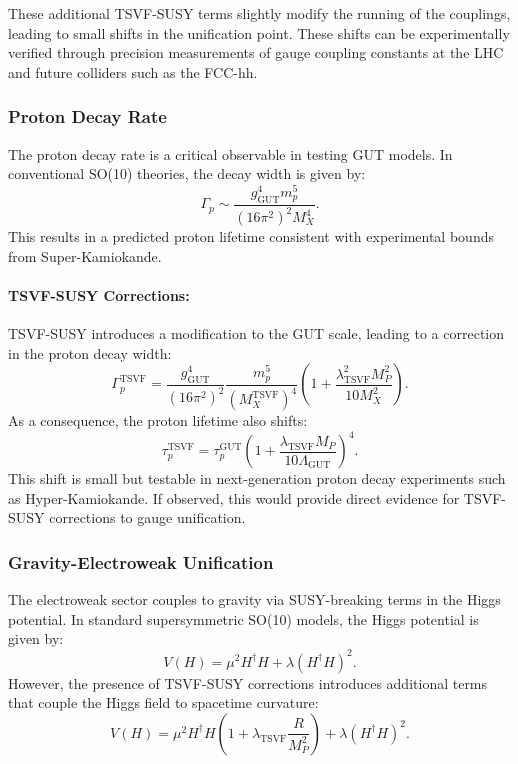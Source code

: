 \documentclass[twocolumn,superscriptaddress,floatfix]{revtex4-2}
\begin{document}
These additional TSVF-SUSY terms slightly modify the running of the couplings, leading to small shifts in the unification point. These shifts can be experimentally verified through precision measurements of gauge coupling constants at the LHC and future colliders such as the FCC-hh.

\subsubsection{Proton Decay Rate}
\label{subsec:proton_decay_rate}

The proton decay rate is a critical observable in testing GUT models. In conventional SO(10) theories, the decay width is given by:
\begin{equation}
\Gamma_p \sim \frac{g_{\text{GUT}}^4 m_p^5}{(16\pi^2)^2 M_X^4}. \label{eq:gamma_p}
\end{equation}
This results in a predicted proton lifetime consistent with experimental bounds from Super-Kamiokande.

\paragraph{TSVF-SUSY Corrections:} 
TSVF-SUSY introduces a modification to the GUT scale, leading to a correction in the proton decay width:
\begin{equation}
\Gamma_p^{\text{TSVF}} = \frac{g_{\text{GUT}}^4}{(16\pi^2)^2}\frac{m_p^5}{(M_X^{\text{TSVF}})^4}\left(1 + \frac{\lambda_{\text{TSVF}}^2 M_P^2}{10M_X^2}\right). \label{eq:Gamma_p}
\end{equation}
As a consequence, the proton lifetime also shifts:
\begin{equation}
\tau_p^{\text{TSVF}} = \tau_p^{\text{GUT}}\left(1 + \frac{\lambda_{\text{TSVF}} M_P}{10\Lambda_{\text{GUT}}}\right)^4. \label{eq:tau_TSVF}
\end{equation}
This shift is small but testable in next-generation proton decay experiments such as Hyper-Kamiokande. If observed, this would provide direct evidence for TSVF-SUSY corrections to gauge unification.

\subsubsection{Gravity-Electroweak Unification}
\label{subsec:ew_unification}

The electroweak sector couples to gravity via SUSY-breaking terms in the Higgs potential. In standard supersymmetric SO(10) models, the Higgs potential is given by:
\begin{equation}  
V(H) = \mu^2 H^\dagger H + \lambda (H^\dagger H)^2.  
\label{eq:higgs_potential_standard}
\end{equation}
However, the presence of TSVF-SUSY corrections introduces additional terms that couple the Higgs field to spacetime curvature:
\begin{equation}  
V(H) = \mu^2 H^\dagger H \left(1 + \lambda_{\text{TSVF}} \frac{R}{M_P^2}\right) + \lambda (H^\dagger H)^2.  
\label{eq:higgs_potential_tsvf}
\end{equation}
\end{document}
